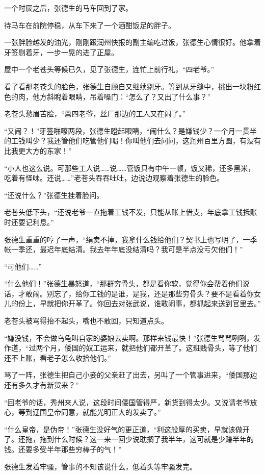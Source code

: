 一个时辰之后，张德生的马车回到了家。

待马车在前院停稳，从车下来了一个酒酣饭足的胖子。

一张胖脸越发的油光，刚刚跟润州快报的副主编吃过饭，张德生心情很好。他拿着牙签剔着牙，一步一晃的进了正屋。

屋中一个老苍头等候已久，见了张德生，连忙上前行礼，“四老爷。”

看了看那老苍头的脸色，张德生自顾自又继续剔牙。等到从牙缝中，挑出一块粉红色的肉，他方斜睨着眼睛，吊着嗓门：“怎么了？又出了什么事？”

老苍头愁眉苦脸，“禀四老爷，丝厂那边的工人又在闹了。”

“又闹？！”牙签啪嚓两段，张德生瞪起眼睛，“闹什么？是嫌钱少？一个月一贯半的工钱叫少？我还管他们吃管他们喝！你叫他们去问问，这润州百里方圆，有没有比我更大方的东家！”

“小人也这么说。可那些工人说……说……管饭只有中午一顿，饭又稀，还多黑米，吃着有怪味。还说……”老苍头吞吞吐吐，边说边观察着张德生的脸色。

“还说什么？”张德生挂着脸问。

老苍头低下头，“还说老爷一直拖着工钱不发，只能从账上借支，年底拿工钱抵账时还要记利息。”

张德生重重的哼了一声，“绢卖不掉，我拿什么钱给他们？契书上也写明了，一季帐一季还，最迟年底结清。我去年年底没结清吗？我可是半点没亏欠他们！”

“可他们……”

“什么他们！”张德生暴怒道，“那群穷骨头，都是看你软，觉得你会帮着他们说话，才敢闹。别忘了，给你工钱的是谁，是我，还是那些穷骨头？要不是看着你女儿的份上，早就把你开革了。你回去对张武说，谁敢闹事，都抓起来送到官里去。”

老苍头被骂得抬不起头，嘴也不敢回，只知道点头。

“嫌没钱，不会做乌龟叫自家的婆娘去卖啊。那样来钱最快！”张德生骂骂咧咧，发作道，“过两个月，倭国的奴工运来，就把他们都开革了。这班贱骨头，等了他们还不上账，看老子怎么收拾他们。”

骂了一阵，张德生把自己小妾的父亲赶了出去，另叫了一个管事进来，“倭国那边还有多久才有新货来？”

“回老爷的话，秀州来人说，这段时间倭国管得严，新货到得太少。又说请老爷放心，等到辽国皇帝同意，就能光明正大的发卖了。”

“什么皇帝，是伪帝！”张德生没好气的更正道，“利这般厚的买卖，早就该做开了。还拖，拖到什么时候？这一来一回少说耽搁了我半年，这可就是少赚半年的钱。还要多受半年那些穷棒子的气！”

张德生发着牢骚，管事的不知该说什么，低着头等牢骚发完。

